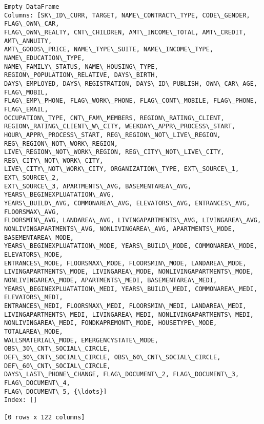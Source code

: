 \documentclass[11pt]{article}
\makeatletter
\newcommand{\boxspacing}{\kern\kvtcb@left@rule\kern\kvtcb@boxsep}
\newcommand{\prompt}[4]{
        {\ttfamily\llap{{\color{#2}[#3]:\hspace{3pt}#4}}\vspace{-\baselineskip}}
    }
\makeatother
\begin{document}
            \begin{tcolorbox}[breakable, size=fbox, boxrule=.5pt, pad at break*=1mm, opacityfill=0]
\prompt{Out}{outcolor}{39}{\boxspacing}
\begin{Verbatim}[commandchars=\\\{\}]
Empty DataFrame
Columns: [SK\_ID\_CURR, TARGET, NAME\_CONTRACT\_TYPE, CODE\_GENDER, FLAG\_OWN\_CAR,
FLAG\_OWN\_REALTY, CNT\_CHILDREN, AMT\_INCOME\_TOTAL, AMT\_CREDIT, AMT\_ANNUITY,
AMT\_GOODS\_PRICE, NAME\_TYPE\_SUITE, NAME\_INCOME\_TYPE, NAME\_EDUCATION\_TYPE,
NAME\_FAMILY\_STATUS, NAME\_HOUSING\_TYPE, REGION\_POPULATION\_RELATIVE, DAYS\_BIRTH,
DAYS\_EMPLOYED, DAYS\_REGISTRATION, DAYS\_ID\_PUBLISH, OWN\_CAR\_AGE, FLAG\_MOBIL,
FLAG\_EMP\_PHONE, FLAG\_WORK\_PHONE, FLAG\_CONT\_MOBILE, FLAG\_PHONE, FLAG\_EMAIL,
OCCUPATION\_TYPE, CNT\_FAM\_MEMBERS, REGION\_RATING\_CLIENT,
REGION\_RATING\_CLIENT\_W\_CITY, WEEKDAY\_APPR\_PROCESS\_START,
HOUR\_APPR\_PROCESS\_START, REG\_REGION\_NOT\_LIVE\_REGION, REG\_REGION\_NOT\_WORK\_REGION,
LIVE\_REGION\_NOT\_WORK\_REGION, REG\_CITY\_NOT\_LIVE\_CITY, REG\_CITY\_NOT\_WORK\_CITY,
LIVE\_CITY\_NOT\_WORK\_CITY, ORGANIZATION\_TYPE, EXT\_SOURCE\_1, EXT\_SOURCE\_2,
EXT\_SOURCE\_3, APARTMENTS\_AVG, BASEMENTAREA\_AVG, YEARS\_BEGINEXPLUATATION\_AVG,
YEARS\_BUILD\_AVG, COMMONAREA\_AVG, ELEVATORS\_AVG, ENTRANCES\_AVG, FLOORSMAX\_AVG,
FLOORSMIN\_AVG, LANDAREA\_AVG, LIVINGAPARTMENTS\_AVG, LIVINGAREA\_AVG,
NONLIVINGAPARTMENTS\_AVG, NONLIVINGAREA\_AVG, APARTMENTS\_MODE, BASEMENTAREA\_MODE,
YEARS\_BEGINEXPLUATATION\_MODE, YEARS\_BUILD\_MODE, COMMONAREA\_MODE, ELEVATORS\_MODE,
ENTRANCES\_MODE, FLOORSMAX\_MODE, FLOORSMIN\_MODE, LANDAREA\_MODE,
LIVINGAPARTMENTS\_MODE, LIVINGAREA\_MODE, NONLIVINGAPARTMENTS\_MODE,
NONLIVINGAREA\_MODE, APARTMENTS\_MEDI, BASEMENTAREA\_MEDI,
YEARS\_BEGINEXPLUATATION\_MEDI, YEARS\_BUILD\_MEDI, COMMONAREA\_MEDI, ELEVATORS\_MEDI,
ENTRANCES\_MEDI, FLOORSMAX\_MEDI, FLOORSMIN\_MEDI, LANDAREA\_MEDI,
LIVINGAPARTMENTS\_MEDI, LIVINGAREA\_MEDI, NONLIVINGAPARTMENTS\_MEDI,
NONLIVINGAREA\_MEDI, FONDKAPREMONT\_MODE, HOUSETYPE\_MODE, TOTALAREA\_MODE,
WALLSMATERIAL\_MODE, EMERGENCYSTATE\_MODE, OBS\_30\_CNT\_SOCIAL\_CIRCLE,
DEF\_30\_CNT\_SOCIAL\_CIRCLE, OBS\_60\_CNT\_SOCIAL\_CIRCLE, DEF\_60\_CNT\_SOCIAL\_CIRCLE,
DAYS\_LAST\_PHONE\_CHANGE, FLAG\_DOCUMENT\_2, FLAG\_DOCUMENT\_3, FLAG\_DOCUMENT\_4,
FLAG\_DOCUMENT\_5, {\ldots}]
Index: []

[0 rows x 122 columns]
\end{Verbatim}
\end{tcolorbox}
        
\end{document}
